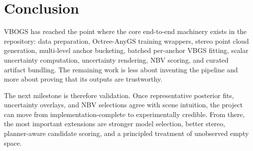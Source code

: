 \documentclass[11pt]{article}
\begin{document}
\section{Conclusion}

VBOGS has reached the point where the core end-to-end machinery exists in the
repository: data preparation, Octree-AnyGS training wrappers, stereo point
cloud generation, multi-level anchor bucketing, batched per-anchor VBGS
fitting, scalar uncertainty computation, uncertainty rendering, NBV scoring,
and curated artifact bundling. The remaining work is less about inventing the
pipeline and more about proving that its outputs are trustworthy.

The next milestone is therefore validation. Once representative posterior fits,
uncertainty overlays, and NBV selections agree with scene intuition, the
project can move from implementation-complete to experimentally credible. From
there, the most important extensions are stronger model selection, better
stereo, planner-aware candidate scoring, and a principled treatment of
unobserved empty space.
\end{document}
